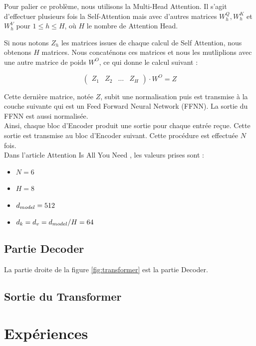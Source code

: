 Pour palier ce problème, nous utilisons la Multi-Head Attention. Il s'agit d'effectuer plusieurs fois la Self-Attention
mais avec d'autres matrices $W_h^Q, W_h^K$ et $W_h^V$ pour $1 \leq h \leq H$, où $H$ le nombre de Attention Head.

Si nous notons $Z_h$ les matrices issues de chaque calcul de Self Attention, nous obtenons $H$ matrices. Nous concaténons
ces matrices et nous les mutliplions avec une autre matrice de poids $W^O$, ce qui donne le calcul suivant :

\[  \begin{pmatrix}
    Z_1 & Z_2 & \ldots & Z_H
  \end{pmatrix}
  \cdot W^O = Z \]


Cette dernière matrice, notée $Z$, subit une normalisation puis est transmise à la couche suivante qui est un Feed Forward Neural Network (FFNN).
La sortie du FFNN est aussi normalisée. \\

Ainsi, chaque bloc d'Encoder produit une sortie pour chaque entrée reçue. Cette sortie est transmise au bloc d'Encoder suivant.
Cette procédure est effectuée $N$ fois. \\

Dans l'article \og Attention Is All You Need \fg{} \cite{vaswani2017attention}, les valeurs prises sont :

\begin{itemize}
  \item $N=6$
  \item $H=8$
  \item $d_{model} = 512$
  \item $d_k = d_v = d_{model}/H = 64$
\end{itemize}


\subsection{Partie Decoder}

La partie droite de la figure \ref{fig:transformer} est la partie Decoder.
\subsection{Sortie du Transformer}


\hypertarget{expuxe9riences}{%
\section{Expériences}\label{expuxe9riences}}

